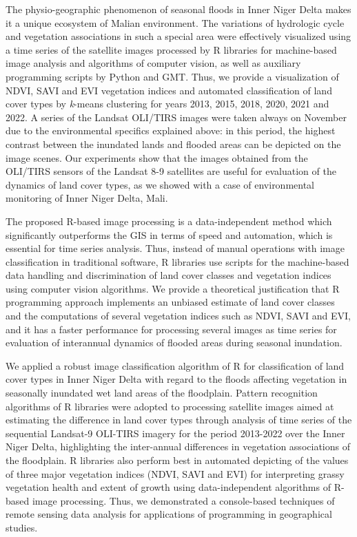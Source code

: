 \documentclass[12pt,a4paper,oneside]{article}
\def \newpar{\vspace{6pt}}
\begin{document}
\newpar The physio-geographic phenomenon of seasonal floods in Inner Niger Delta makes it a unique ecosystem of Malian environment. The variations of hydrologic cycle and vegetation associations in such a special area were effectively visualized using a time series of the satellite images processed by R libraries for machine-based image analysis and  algorithms of computer vision, as well as auxiliary programming scripts by Python and GMT. Thus, we provide a visualization of NDVI, SAVI and EVI vegetation indices and automated classification of land cover types by \emph{k}-means clustering for years 2013, 2015, 2018, 2020, 2021 and 2022. A series of the Landsat OLI/TIRS images were taken always on November due to the environmental specifics explained above: in this period, the highest contrast between the inundated lands and flooded areas can be depicted on the image scenes. Our experiments show that  the images obtained from the OLI/TIRS sensors of the Landsat 8-9 satellites are useful for evaluation of the dynamics of land cover types, as we showed with a case of environmental monitoring of Inner Niger Delta, Mali. 

\newpar The proposed R-based image processing is a data-independent method which significantly outperforms the GIS in terms of speed and automation, which is essential for time series analysis. Thus, instead of manual operations with image classification in traditional software, R libraries use scripts for the machine-based data handling and discrimination of land cover classes and vegetation indices using computer vision algorithms. We provide a theoretical justification that R programming approach implements an unbiased estimate of land cover classes and the computations of several vegetation indices such as NDVI, SAVI and EVI, and it has a faster performance for processing several images as time series for evaluation of interannual dynamics of flooded areas during seasonal inundation. 

\newpar We applied a robust image classification algorithm of R for classification of land cover types in Inner Niger Delta with regard to the floods affecting vegetation in seasonally inundated wet land areas of the floodplain. Pattern recognition algorithms of R libraries were adopted to processing satellite images aimed at estimating the difference in land cover types through analysis of time series of the sequential Landsat-9 OLI-TIRS imagery for the period 2013-2022 over the Inner Niger Delta, highlighting the inter-annual differences in vegetation associations of the floodplain. R libraries also perform best in automated depicting of the values of three major vegetation indices (NDVI, SAVI and EVI) for interpreting grassy vegetation health and extent of growth using data-independent algorithms of R-based image processing. Thus, we demonstrated a console-based techniques of remote sensing data analysis for applications of programming in geographical studies. 
\end{document}
